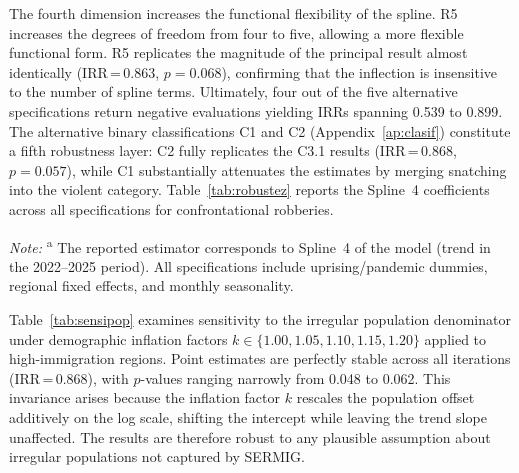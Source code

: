 \documentclass[pdflatex,sn-basic]{sn-jnl}
\newcommand{\tablenote}[1]{%
  \vspace{2pt}%
  {\par\footnotesize\textit{Note:} #1\par}%
}
\begin{document}
The fourth dimension increases the functional flexibility of the spline. R5 increases the degrees of freedom from four to five, allowing a more flexible functional form. R5 replicates the magnitude of the principal result almost identically (IRR\,=\,0.863, $p=0.068$), confirming that the inflection is insensitive to the number of spline terms. Ultimately, four out of the five alternative specifications return negative evaluations yielding IRRs spanning 0.539 to 0.899. The alternative binary classifications C1 and C2 (Appendix~\ref{ap:clasif}) constitute a fifth robustness layer: C2 fully replicates the C3.1 results (IRR\,=\,0.868, $p=0.057$), while C1 substantially attenuates the estimates by merging snatching into the violent category. Table~\ref{tab:robustez} reports the Spline~4 coefficients across all specifications for confrontational robberies.

\begin{table}[htbp]
\centering
\caption{Robustness analysis: trend coefficient beneath alternate equivalents (confrontational robberies, C3.1)}
\label{tab:robustez}
\footnotesize
{}
\tablenote{\textsuperscript{a} The reported estimator corresponds to Spline~4 of the model (trend in the 2022--2025 period). All specifications include uprising/pandemic dummies, regional fixed effects, and monthly seasonality.}
\end{table}

Table~\ref{tab:sensipop} examines sensitivity to the irregular population denominator under demographic inflation factors $k \in \{1.00, 1.05, 1.10, 1.15, 1.20\}$ applied to high-immigration regions. Point estimates are perfectly stable across all iterations (IRR\,=\,0.868), with $p$-values ranging narrowly from 0.048 to 0.062. This invariance arises because the inflation factor $k$ rescales the population offset additively on the log scale, shifting the intercept while leaving the trend slope unaffected. The results are therefore robust to any plausible assumption about irregular populations not captured by SERMIG.
\end{document}
